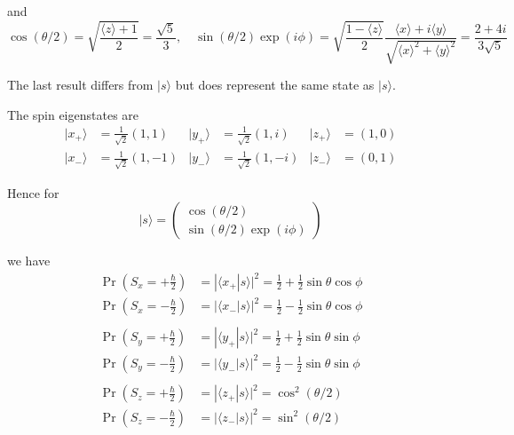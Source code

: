 and
\begin{equation*}
\cos(\theta/2)=\sqrt{\frac{\langle z\rangle+1}{2}}=\frac{\sqrt5}{3},\quad
\sin(\theta/2)\exp(i\phi)=\sqrt{\frac{1-\langle z\rangle}{2}}
\frac{\langle x\rangle+i\langle y\rangle}{\sqrt{\langle x\rangle^2+\langle y\rangle^2}}
=\frac{2+4i}{3\sqrt5}
\end{equation*}

The last result differs from $|s\rangle$ but does represent the same state as $|s\rangle$.

\bigskip
The spin eigenstates are
\begin{align*}
|x_+\rangle&=\tfrac{1}{\sqrt2}(1,1) &
|y_+\rangle&=\tfrac{1}{\sqrt2}(1,i) &
|z_+\rangle&=(1,0)
\\
|x_-\rangle&=\tfrac{1}{\sqrt2}(1,-1) &
|y_-\rangle&=\tfrac{1}{\sqrt2}(1,-i) &
|z_-\rangle&=(0,1)
\end{align*}

Hence for
\begin{equation*}
|s\rangle=\begin{pmatrix}\cos(\theta/2)\\\sin(\theta/2)\exp(i\phi)\end{pmatrix}
\end{equation*}

we have
\begin{align*}
\Pr\left(S_x=+\tfrac{\hbar}{2}\right)
&=|\langle x_+|s\rangle|^2=\tfrac{1}{2}+\tfrac{1}{2}\sin\theta\cos\phi
\\
\Pr\left(S_x=-\tfrac{\hbar}{2}\right)
&=|\langle x_-|s\rangle|^2=\tfrac{1}{2}-\tfrac{1}{2}\sin\theta\cos\phi
\\
\\
\Pr\left(S_y=+\tfrac{\hbar}{2}\right)
&=|\langle y_+|s\rangle|^2=\tfrac{1}{2}+\tfrac{1}{2}\sin\theta\sin\phi
\\
\Pr\left(S_y=-\tfrac{\hbar}{2}\right)
&=|\langle y_-|s\rangle|^2=\tfrac{1}{2}-\tfrac{1}{2}\sin\theta\sin\phi
\\
\\
\Pr\left(S_z=+\tfrac{\hbar}{2}\right)
&=|\langle z_+|s\rangle|^2=\cos^2(\theta/2)
\\
\Pr\left(S_z=-\tfrac{\hbar}{2}\right)
&=|\langle z_-|s\rangle|^2=\sin^2(\theta/2)
\end{align*}


